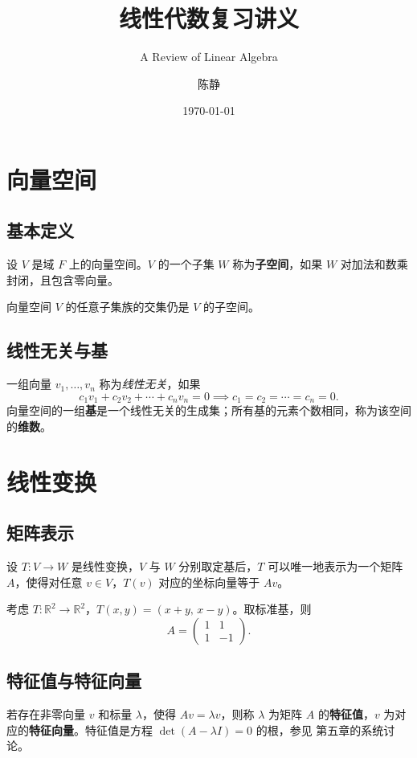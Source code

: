 \documentclass[
  10pt,
  twoside,
  openany,
  b5paper,
  colorscheme = basic,
  xits = false,
]{qyxf-book}
\title{线性代数复习讲义}
\subtitle{A Review of Linear Algebra}
\author{陈静}
\date{\today}
\begin{document}
\maketitle

\tableofcontents

\chapter{向量空间}

\section{基本定义}

设 $V$ 是域 $F$ 上的向量空间。$V$ 的一个子集 $W$ 称为\textbf{子空间}，如果 $W$ 对加法和数乘封闭，且包含零向量。

\begin{tcolorbox}[title=定理 1.1]
向量空间 $V$ 的任意子集族的交集仍是 $V$ 的子空间。
\end{tcolorbox}

\section{线性无关与基}

一组向量 $v_1, \dots, v_n$ 称为\emph{线性无关}，如果
\[
c_1 v_1 + c_2 v_2 + \cdots + c_n v_n = 0 \implies c_1 = c_2 = \cdots = c_n = 0.
\]
向量空间的一组\textbf{基}是一个线性无关的生成集；所有基的元素个数相同，称为该空间的\textbf{维数}。

\chapter{线性变换}

\section{矩阵表示}

设 $T: V \to W$ 是线性变换，$V$ 与 $W$ 分别取定基后，$T$ 可以唯一地表示为一个矩阵 $A$，使得对任意 $v \in V$，$T(v)$ 对应的坐标向量等于 $Av$。

\begin{tcolorbox}[title=例 2.1]
考虑 $T: \mathbb{R}^2 \to \mathbb{R}^2$，$T(x, y) = (x + y,\, x - y)$。取标准基，则
\[
A = \begin{pmatrix} 1 & 1 \\ 1 & -1 \end{pmatrix}.
\]
\end{tcolorbox}

\section{特征值与特征向量}

若存在非零向量 $v$ 和标量 $\lambda$，使得 $Av = \lambda v$，则称 $\lambda$ 为矩阵 $A$ 的\textbf{特征值}，$v$ 为对应的\textbf{特征向量}。特征值是方程 $\det(A - \lambda I) = 0$ 的根，参见 \citet{strang2016linear} 第五章的系统讨论。



\end{document}
